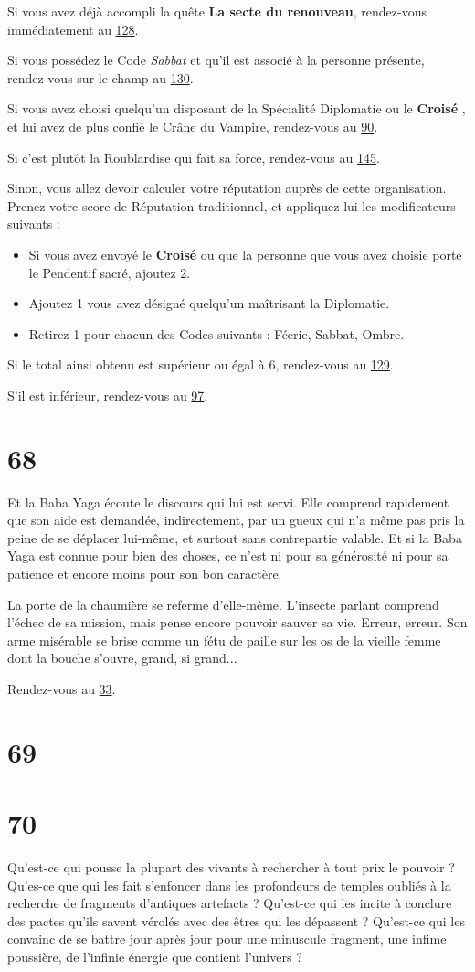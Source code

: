 \documentclass{report}
\newcommand{\gsection}[1]{
    \section{#1}
    \label{section-#1}
}
\newcommand{\glink}[1]{\hyperref[section-#1]{#1}}
\newcommand{\hero}[1]{
    \textbf{#1}
}
\begin{document}
Si vous avez déjà accompli la quête \textbf{La secte du renouveau}, rendez-vous immédiatement au \glink{128}.

Si vous possédez le Code \emph{Sabbat} et qu'il est associé à la personne présente, rendez-vous sur le champ au \glink{130}.

Si vous avez choisi quelqu'un disposant de la Spécialité Diplomatie ou le \hero{Croisé}, et lui avez de plus confié le Crâne du Vampire, rendez-vous au \glink{90}.

Si c'est plutôt la Roublardise qui fait sa force, rendez-vous au \glink{145}.

Sinon, vous allez devoir calculer votre réputation auprès de cette organisation. Prenez votre score de Réputation traditionnel, et appliquez-lui les modificateurs suivants :

\begin{itemize}
\item Si vous avez envoyé le \hero{Croisé} ou que la personne que vous avez choisie porte le Pendentif sacré, ajoutez 2.
\item Ajoutez 1 vous avez désigné quelqu'un maîtrisant la Diplomatie.
\item Retirez 1 pour chacun des Codes suivants : Féerie, Sabbat, Ombre.
\end{itemize}

Si le total ainsi obtenu est supérieur ou égal à 6, rendez-vous au \glink{129}.

S'il est inférieur, rendez-vous au \glink{97}.

\gsection{68}

Et la Baba Yaga écoute le discours qui lui est servi. Elle comprend rapidement que son aide est demandée, indirectement, par un gueux qui n'a même pas pris la peine de se déplacer lui-même, et surtout sans contrepartie valable. Et si la Baba Yaga est connue pour bien des choses, ce n'est ni pour sa générosité ni pour sa patience et encore moins pour son bon caractère.

La porte de la chaumière se referme d'elle-même. L'insecte parlant comprend l'échec de sa mission, mais pense encore pouvoir sauver sa vie. Erreur, erreur. Son arme misérable se brise comme un fétu de paille sur les os de la vieille femme dont la bouche s'ouvre, grand, si grand...

Rendez-vous au \glink{33}.

\gsection{69}

\gsection{70}

Qu'est-ce qui pousse la plupart des vivants à rechercher à tout prix le pouvoir ? Qu'es-ce que qui les fait s'enfoncer dans les profondeurs de temples oubliés à la recherche de fragments d'antiques artefacts ? Qu'est-ce qui les incite à conclure des pactes qu'ils savent vérolés avec des êtres qui les dépassent ? Qu'est-ce qui les convainc de se battre jour après jour pour une minuscule fragment, une infime poussière, de l'infinie énergie que contient l'univers ?
\end{document}
